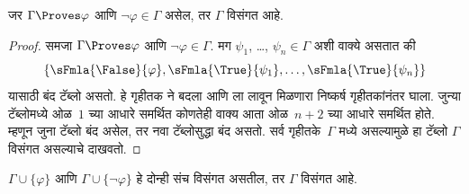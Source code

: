 \begin{prop}\label{fol:tab:prv:prop:explicit-inc}
  जर $\Gamma \Proves \varphi$ आणि $\lnot \varphi \in \Gamma$ असेल, तर $\Gamma$
  विसंगत आहे.
\end{prop}

\begin{proof}
  समजा $\Gamma \Proves \varphi$ आणि $\lnot \varphi \in \Gamma$. मग
  $\psi_1$, \dots, $\psi_n \in \Gamma$ अशी वाक्ये असतात की
  \[  \{\sFmla{\False}{\varphi}, \sFmla{\True}{\psi_1}, \dots, \sFmla{\True}{\psi_n}\}
  \]
  यासाठी बंद टॅब्लो असतो. \sFmla{\False}{\varphi} हे गृहीतक
  \sFmla{\True}{\lnot \varphi} ने बदला आणि \sFmla{\True}{\lnot \varphi} ला
  \TRule{\True}{\lnot} लावून मिळणारा निष्कर्ष गृहीतकांनंतर घाला. जुन्या
  टॅब्लोमध्ये ओळ~$1$ च्या आधारे समर्थित कोणतेही वाक्य आता
  ओळ~$n+2$ च्या आधारे समर्थित होते. म्हणून जुना टॅब्लो बंद असेल, तर
  नवा टॅब्लोसुद्धा बंद असतो. सर्व गृहीतके~$\Gamma$ मध्ये असल्यामुळे हा टॅब्लो
  $\Gamma$ विसंगत असल्याचे दाखवतो.
\end{proof}

\begin{prop}\label{fol:tab:prv:prop:provability-exhaustive}
  $\Gamma \cup \{\varphi\}$ आणि $\Gamma \cup \{\lnot \varphi\}$ हे दोन्ही संच
  विसंगत असतील, तर $\Gamma$ विसंगत आहे.
\end{prop}

